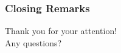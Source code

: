   


\begin{frame}
  \frametitle{Closing Remarks}
  \centering
  {\Large Thank you for your attention!}\\
  \vspace{2em}
  {\large Any questions?}
\end{frame}





